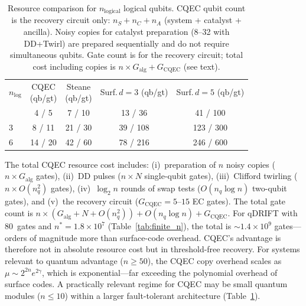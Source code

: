 \documentclass[pra,twocolumn,superscriptaddress,longbibliography,floatfix]{revtex4-2}
\begin{document}
\begin{table}[!tbp]
\caption{Resource comparison for $n_\mathrm{logical}$ logical qubits. CQEC qubit count is the recovery circuit only: $n_S + n_C + n_A$ (system + catalyst + ancilla). Noisy copies for catalyst preparation (8--32 with DD+Twirl) are prepared sequentially and do not require simultaneous qubits. Gate count is for the recovery circuit; total cost including copies is $n \times G_\mathrm{alg} + G_\mathrm{CQEC}$ (see text).}
\label{tab:resources}
\centering\scriptsize
\setlength{\tabcolsep}{3pt}
\begin{ruledtabular}
\begin{tabular}{lcccc}
$n_\mathrm{log}$ & \makecell{CQEC\\(qb/gt)} & \makecell{Steane\\(qb/gt)} & \makecell{Surf.\,$d{=}3$\\(qb/gt)} & \makecell{Surf.\,$d{=}5$\\(qb/gt)} \\
\colrule
1 & 4 / 5 & 7 / 10 & 13 / 36 & 41 / 100 \\
3 & 8 / 11 & 21 / 30 & 39 / 108 & 123 / 300 \\
6 & 14 / 20 & 42 / 60 & 78 / 216 & 246 / 600 \\
\end{tabular}
\end{ruledtabular}
\end{table}

The total CQEC resource cost includes: (i)~preparation of $n$ noisy copies ($n \times G_\mathrm{alg}$ gates), (ii)~DD pulses ($n \times N$ single-qubit gates), (iii)~Clifford twirling ($n \times O(n_q^2)$ gates), (iv)~$\log_2 n$ rounds of swap tests ($O(n_q \log n)$ two-qubit gates), and (v)~the recovery circuit ($G_\mathrm{CQEC} = 5$--$15$ EC gates).
The total gate count is $n \times (G_\mathrm{alg} + N + O(n_q^2)) + O(n_q \log n) + G_\mathrm{CQEC}$.
For qDRIFT with 80~gates and $n^* = 1.8 \times 10^7$ (Table~\ref{tab:finite_n}), the total is $\sim 1.4 \times 10^9$ gates---orders of magnitude more than surface-code overhead.
CQEC's advantage is therefore not in absolute resource cost but in threshold-free recovery.
For systems relevant to quantum advantage ($n \geq 50$), the CQEC copy overhead scales as $\mu \sim 2^{2n} e^{2\gamma}$, which is exponential---far exceeding the polynomial overhead of surface codes.
A practically relevant regime for CQEC may be small quantum modules ($n \leq 10$) within a larger fault-tolerant architecture (Table~\ref{tab:resources}).
\end{document}

